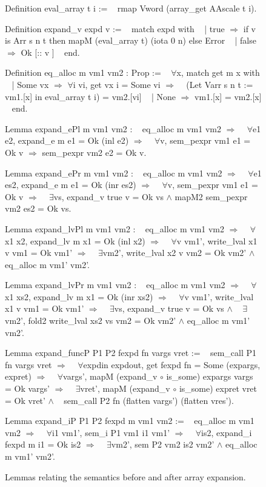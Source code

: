 \documentclass{article}
\begin{document}
\begin{figure}[p]
\obeylines\obeyspaces\ttfamily%
Definition eval\_array t i :=
~ rmap Vword (array\_get AAscale t i).

Definition expand\_v expd v :=
~ match expd with
~ | true  \(\Rightarrow\) if v is Arr s n t then mapM (eval\_array t) (iota 0 n) else Error
~ | false \(\Rightarrow\) Ok [:: v ]
~ end.

Definition eq\_alloc m vm1 vm2 : Prop :=
~ \(\forall\)x, match get m x with
~ | Some vx \(\Rightarrow\) \(\forall\)i vi, get vx i = Some vi \(\Longrightarrow\)
~   (Let Varr s n t := vm1.[x] in eval\_array t i) = vm2.[vi]
~ | None \(\Rightarrow\) vm1.[x] = vm2.[x]
~ end.

Lemma expand\_ePl m vm1 vm2 :
~ eq\_alloc m vm1 vm2 \(\Longrightarrow\)
~ \(\forall\)e1 e2, expand\_e m e1 = Ok (inl e2) \(\Longrightarrow\)
~ \(\forall\)v, sem\_pexpr vm1 e1 = Ok v \(\Longrightarrow\) sem\_pexpr vm2 e2 = Ok v.

Lemma expand\_ePr m vm1 vm2 :
~ eq\_alloc m vm1 vm2 \(\Longrightarrow\)
~ \(\forall\)e1 es2, expand\_e m e1 = Ok (inr es2) \(\Longrightarrow\)
~ \(\forall\)v, sem\_pexpr vm1 e1 = Ok v \(\Longrightarrow\)
~ \(\exists\)vs, expand\_v true v = Ok vs \(\wedge\) mapM2 sem\_pexpr vm2 es2 = Ok vs.

Lemma expand\_lvPl m vm1 vm2 :
~ eq\_alloc m vm1 vm2 \(\Longrightarrow\)
~ \(\forall\)x1 x2, expand\_lv m x1 = Ok (inl x2) \(\Longrightarrow\)
~ \(\forall\)v vm1', write\_lval x1 v vm1 = Ok vm1' \(\Longrightarrow\)
~ \(\exists\)vm2', write\_lval x2 v vm2 = Ok vm2' \(\wedge\) eq\_alloc m vm1' vm2'.

Lemma expand\_lvPr m vm1 vm2 :
~ eq\_alloc m vm1 vm2 \(\Longrightarrow\)
~ \(\forall\)x1 xs2, expand\_lv m x1 = Ok (inr xs2) \(\Longrightarrow\)
~ \(\forall\)v vm1', write\_lval x1 v vm1 = Ok vm1' \(\Longrightarrow\)
~ \(\exists\)vs, expand\_v true v = Ok vs \(\wedge\)
~   \(\exists\)vm2', fold2 write\_lval xs2 vs vm2 = Ok vm2' \(\wedge\) eq\_alloc m vm1' vm2'.

Lemma expand\_funcP P1 P2 fexpd fn vargs vret :=
~ sem\_call P1 fn vargs vret \(\Longrightarrow\)
~ \(\forall\)expdin expdout, get fexpd fn = Some (expargs, expret) \(\Longrightarrow\)
~ \(\forall\)vargs', mapM (expand\_v \(\circ\) is\_some) expargs vargs = Ok vargs' \(\Longrightarrow\)
~ \(\exists\)vret',  mapM (expand\_v \(\circ\) is\_some) expret  vret  = Ok vret'  \(\wedge\)
~   sem\_call P2 fn (flatten vargs') (flatten vres').

Lemma expand\_iP P1 P2 fexpd m vm1 vm2 :=
~ eq\_alloc m vm1 vm2 \(\Longrightarrow\)
~ \(\forall\)i1 vm1', sem\_i P1 vm1 i1 vm1' \(\Longrightarrow\)
~ \(\forall\)is2, expand\_i fexpd m i1 = Ok is2 \(\Longrightarrow\)
~ \(\exists\)vm2', sem P2 vm2 is2 vm2' \(\wedge\) eq\_alloc m vm1' vm2'.
\normalfont%
\caption{Lemmas relating the semantics before and after array expansion.}
\end{figure}
\end{document}
